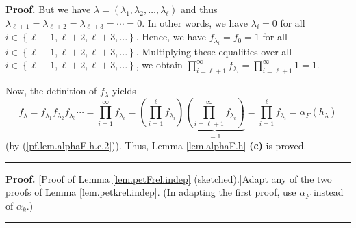\documentclass[numbers=enddot,12pt,final,onecolumn,notitlepage]{scrartcl}%
\theoremstyle{definition}
\newenvironment{proof}[1][Proof]{\noindent\textbf{#1.} }{\ \rule{0.5em}{0.5em}}
\let\prodnonlimits\prod
\renewcommand{\prod}{\prodnonlimits\limits}
\newenvironment{verlong}{}{}
\newenvironment{vershort}{}{}
\begin{document}
\begin{verlong}
\begin{proof}
But we have $\lambda=\left(  \lambda_{1},\lambda_{2},\ldots,\lambda_{\ell
}\right)  $ and thus $\lambda_{\ell+1}=\lambda_{\ell+2}=\lambda_{\ell
+3}=\cdots=0$. In other words, we have $\lambda_{i}=0$ for all $i\in\left\{
\ell+1,\ell+2,\ell+3,\ldots\right\}  $. Hence, we have $f_{\lambda_{i}}%
=f_{0}=1$ for all $i\in\left\{  \ell+1,\ell+2,\ell+3,\ldots\right\}  $.
Multiplying these equalities over all $i\in\left\{  \ell+1,\ell+2,\ell
+3,\ldots\right\}  $, we obtain $\prod_{i=\ell+1}^{\infty}f_{\lambda_{i}%
}=\prod_{i=\ell+1}^{\infty}1=1$.

Now, the definition of $f_{\lambda}$ yields%
\[
f_{\lambda}=f_{\lambda_{1}}f_{\lambda_{2}}f_{\lambda_{3}}\cdots=\prod
_{i=1}^{\infty}f_{\lambda_{i}}=\left(  \prod_{i=1}^{\ell}f_{\lambda_{i}%
}\right)  \underbrace{\left(  \prod_{i=\ell+1}^{\infty}f_{\lambda_{i}}\right)
}_{=1}=\prod_{i=1}^{\ell}f_{\lambda_{i}}=\alpha_{F}\left(  h_{\lambda}\right)
\]
(by (\ref{pf.lem.alphaF.h.c.2})). Thus, Lemma \ref{lem.alphaF.h} \textbf{(c)}
is proved.
\end{proof}
\end{verlong}

\begin{vershort}
\begin{proof}
[Proof of Lemma \ref{lem.petFrel.indep} (sketched).]Adapt any of the two
proofs of Lemma \ref{lem.petkrel.indep}. (In adapting the first proof, use
$\alpha_{F}$ instead of $\alpha_{k}$.)
\end{proof}
\end{vershort}
\end{document}
